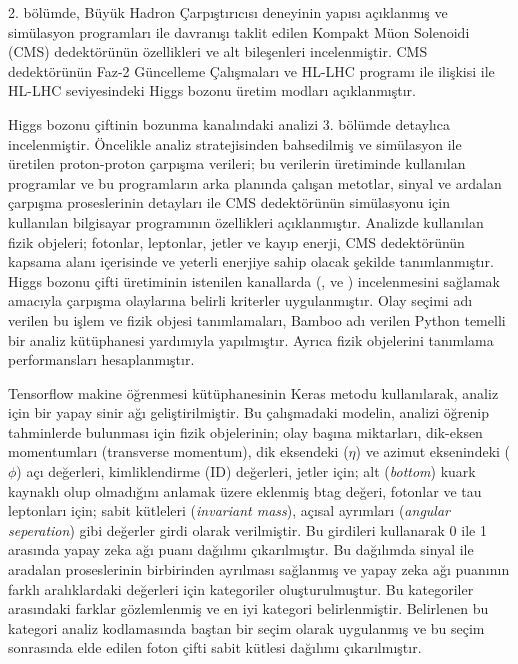 2. bölümde, Büyük Hadron Çarpıştırıcısı deneyinin yapısı açıklanmış ve simülasyon programları ile davranışı taklit edilen Kompakt Müon Solenoidi (CMS) dedektörünün özellikleri ve alt bileşenleri incelenmiştir. CMS dedektörünün Faz-2 Güncelleme Çalışmaları ve HL-LHC programı ile ilişkisi ile HL-LHC seviyesindeki Higgs bozonu üretim modları açıklanmıştır.

Higgs bozonu çiftinin \ttgg bozunma kanalındaki analizi  3. bölümde detaylıca incelenmiştir. Öncelikle analiz stratejisinden bahsedilmiş ve simülasyon ile üretilen proton-proton çarpışma verileri; bu verilerin üretiminde kullanılan programlar ve bu programların arka planında çalışan metotlar, sinyal ve ardalan çarpışma proseslerinin detayları ile CMS dedektörünün simülasyonu için kullanılan bilgisayar programının özellikleri açıklanmıştır. Analizde kullanılan fizik objeleri; fotonlar, leptonlar, jetler ve kayıp enerji, CMS dedektörünün kapsama alanı içerisinde ve yeterli enerjiye sahip olacak şekilde tanımlanmıştır. Higgs bozonu çifti üretiminin istenilen kanallarda (\ttgg, \wwgg ve \zzgg) incelenmesini sağlamak amacıyla çarpışma olaylarına belirli kriterler uygulanmıştır. Olay seçimi adı verilen bu işlem ve fizik objesi tanımlamaları, Bamboo adı verilen Python temelli bir analiz kütüphanesi yardımıyla yapılmıştır. Ayrıca fizik objelerini tanımlama performansları hesaplanmıştır.

Tensorflow makine öğrenmesi kütüphanesinin Keras metodu kullanılarak, analiz için bir yapay sinir ağı geliştirilmiştir. Bu çalışmadaki modelin, analizi öğrenip tahminlerde bulunması için fizik objelerinin; olay başına miktarları, dik-eksen momentumları (transverse momentum), dik eksendeki ($\eta$) ve azimut eksenindeki ($\phi$) açı değerleri, kimliklendirme (ID) değerleri, jetler için; alt (\emph{bottom}) kuark kaynaklı olup olmadığını anlamak üzere eklenmiş btag değeri, fotonlar ve tau leptonları için; sabit kütleleri (\emph{invariant mass}), açısal ayrımları (\emph{angular seperation}) gibi değerler girdi olarak verilmiştir. Bu girdileri kullanarak 0 ile 1 arasında yapay zeka ağı puanı dağılımı çıkarılmıştır. Bu dağılımda sinyal ile aradalan proseslerinin birbirinden ayrılması sağlanmış ve yapay zeka ağı puanının farklı aralıklardaki değerleri için kategoriler oluşturulmuştur. Bu kategoriler arasındaki farklar gözlemlenmiş ve en iyi kategori belirlenmiştir. Belirlenen bu kategori analiz kodlamasında baştan bir seçim olarak uygulanmış ve bu seçim sonrasında elde edilen foton çifti sabit kütlesi dağılımı çıkarılmıştır.

